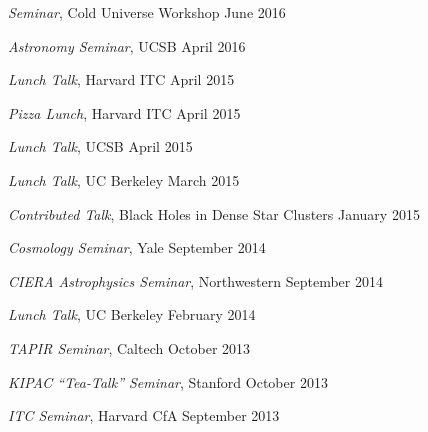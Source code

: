 \begin{talkenum}

\item \textit{Seminar}, Cold Universe Workshop \hspace*{\fill} June 2016

\item \textit{Astronomy Seminar}, UCSB \hspace*{\fill} April 2016

\item \textit{Lunch Talk}, Harvard ITC \hspace*{\fill} April 2015

\item \textit{Pizza Lunch}, Harvard ITC \hspace*{\fill} April 2015

\item \textit{Lunch Talk}, UCSB \hspace*{\fill} April 2015

\item \textit{Lunch Talk}, UC Berkeley \hspace*{\fill} March 2015

\item \textit{Contributed Talk}, Black Holes in Dense Star Clusters \hspace*{\fill} January 2015

\item \textit{Cosmology Seminar}, Yale \hspace*{\fill} September 2014

\item \textit{CIERA Astrophysics Seminar}, Northwestern \hspace*{\fill} September 2014

\item \textit{Lunch Talk}, UC Berkeley \hspace*{\fill} February 2014

\item \textit{TAPIR Seminar}, Caltech \hspace*{\fill} October 2013

\item \textit{KIPAC “Tea-Talk” Seminar}, Stanford \hspace*{\fill} October 2013

\item \textit{ITC Seminar}, Harvard CfA \hspace*{\fill} September 2013


\end{talkenum}
